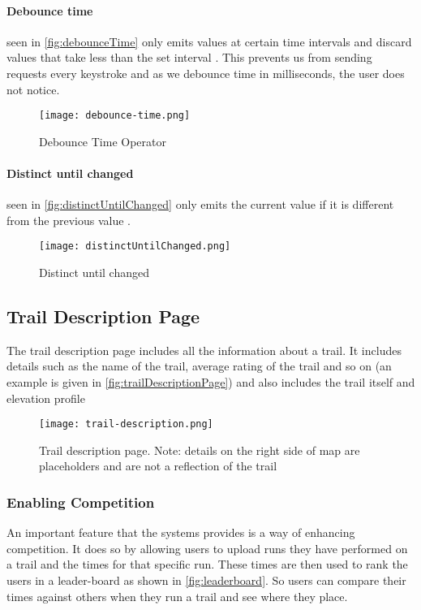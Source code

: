 \paragraph{Debounce time} seen in \autoref{fig:debounceTime} only emits values at certain time intervals and discard values that take less than the set interval \cite{leanrrxjs2019debounce}. This prevents us from sending requests every keystroke and as we debounce time in milliseconds, the user does not notice.

\begin{figure}[htb!]
    \centering
    \texttt{[image: debounce-time.png]}
    \caption{Debounce Time Operator}
    \label{fig:debounceTime}
\end{figure}

\paragraph{Distinct until changed} seen in \autoref{fig:distinctUntilChanged} only emits the current value if it is different from the previous value \cite{leanrrxjs2019distinct}.
\begin{figure}[htb!]
    \centering
    \texttt{[image: distinctUntilChanged.png]}
    \caption{Distinct until changed}
    \label{fig:distinctUntilChanged}
\end{figure}

\subsection{Trail Description Page}
The trail description page includes all the information about a trail. It includes details such as the name of the trail, average rating of the trail and so on (an example is given in \autoref{fig:trailDescriptionPage}) and also includes the trail itself and elevation profile

\begin{figure}[htb!]
    \centering
    \texttt{[image: trail-description.png]}
    \caption{Trail description page. Note: details on the right side of map are placeholders and are not a reflection of the trail}
    \label{fig:trailDescriptionPage}
\end{figure}

\subsubsection{Enabling Competition}
An important feature that the systems provides is a way of enhancing competition. It does so by allowing users to upload runs they have performed on a trail and the times for that specific run. These times are then used to rank the users in a leader-board as shown in \autoref{fig:leaderboard}. So users can compare their times against others when they run a trail and see where they place. 

